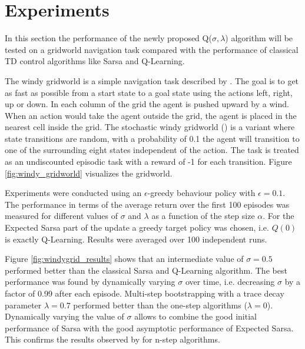 \documentclass{article} %
\begin{document}
\section{Experiments}

In this section the performance of the newly proposed Q($\sigma, \lambda$) algorithm will be tested on a gridworld navigation task compared with the performance of classical TD control algorithms like Sarsa and Q-Learning.


The windy gridworld is a simple navigation task described by \cite{sutton1998}. The goal is to get as fast as possible from a start state to a goal state using the actions left, right, up or down. In each column of the grid the agent is pushed upward by a wind. When an action would take the agent outside the grid, the agent is placed in the nearest cell inside the grid. The stochastic windy gridworld (\cite{deasis2017}) is a variant where state transitions are random, with a probability of 0.1 the agent will transition to one of the surrounding eight states independent of the action.
The task is treated as an undiscounted episodic task with a reward of -1 for each transition. Figure \ref{fig:windy_gridworld} visualizes the gridworld. 

Experiments were conducted using an $\epsilon$-greedy behaviour policy with $\epsilon = 0.1$. The performance in terms of the average return over the first 100 episodes was measured for different values of $\sigma$ and $\lambda$ as a function of the step size $\alpha$. For the Expected Sarsa part of the update a greedy target policy was chosen, i.e. $Q(0)$ is exactly Q-Learning. Results were averaged over 100 independent runs.

Figure \ref{fig:windygrid_results} shows that an intermediate value of $\sigma = 0.5$ performed better than the classical Sarsa and Q-Learning algorithm. The best performance was found by dynamically varying $\sigma$ over time, i.e. decreasing $\sigma$ by a factor of 0.99 after each episode. Multi-step bootstrapping with a trace decay parameter $\lambda = 0.7$ performed better than the one-step algorithms ($\lambda = 0$). Dynamically varying the value of $\sigma$ allows to combine the good initial performance of Sarsa with the good asymptotic performance of Expected Sarsa. This confirms the results observed by \cite{deasis2017} for n-step algorithms.
\end{document}

